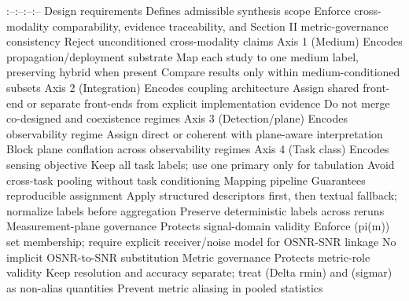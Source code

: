 {}\markdownRendererPipe{}:--\markdownRendererPipe{}:--\markdownRendererPipe{}:--\markdownRendererPipe{}:--\markdownRendererPipe{}\markdownRendererSoftLineBreak
{}\markdownRendererPipe{} Design requirements \markdownRendererPipe{} Defines admissible synthesis scope \markdownRendererPipe{} Enforce cross-modality comparability, evidence traceability, and Section II metric-governance consistency \markdownRendererPipe{} Reject unconditioned cross-modality claims \markdownRendererPipe{}\markdownRendererSoftLineBreak
{}\markdownRendererPipe{} Axis 1 (Medium) \markdownRendererPipe{} Encodes propagation/deployment substrate \markdownRendererPipe{} Map each study to one medium label, preserving hybrid when present \markdownRendererPipe{} Compare results only within medium-conditioned subsets \markdownRendererPipe{}\markdownRendererSoftLineBreak
{}\markdownRendererPipe{} Axis 2 (Integration) \markdownRendererPipe{} Encodes coupling architecture \markdownRendererPipe{} Assign shared front-end or separate front-ends from explicit implementation evidence \markdownRendererPipe{} Do not merge co-designed and coexistence regimes \markdownRendererPipe{}\markdownRendererSoftLineBreak
{}\markdownRendererPipe{} Axis 3 (Detection/plane) \markdownRendererPipe{} Encodes observability regime \markdownRendererPipe{} Assign direct or coherent with plane-aware interpretation \markdownRendererPipe{} Block plane conflation across observability regimes \markdownRendererPipe{}\markdownRendererSoftLineBreak
{}\markdownRendererPipe{} Axis 4 (Task class) \markdownRendererPipe{} Encodes sensing objective \markdownRendererPipe{} Keep all task labels; use one primary only for tabulation \markdownRendererPipe{} Avoid cross-task pooling without task conditioning \markdownRendererPipe{}\markdownRendererSoftLineBreak
{}\markdownRendererPipe{} Mapping pipeline \markdownRendererPipe{} Guarantees reproducible assignment \markdownRendererPipe{} Apply structured descriptors first, then textual fallback; normalize labels before aggregation \markdownRendererPipe{} Preserve deterministic labels across reruns \markdownRendererPipe{}\markdownRendererSoftLineBreak
{}\markdownRendererPipe{} Measurement-plane governance \markdownRendererPipe{} Protects signal-domain validity \markdownRendererPipe{} Enforce (\markdownRendererBackslash{}pi(m)) set membership; require explicit receiver/noise model for OSNR-SNR linkage \markdownRendererPipe{} No implicit OSNR-to-SNR substitution \markdownRendererPipe{}\markdownRendererSoftLineBreak
{}\markdownRendererPipe{} Metric governance \markdownRendererPipe{} Protects metric-role validity \markdownRendererPipe{} Keep resolution and accuracy separate; treat (\markdownRendererBackslash{}Delta r\markdownRendererUnderscore{}\markdownRendererLeftBrace{}\markdownRendererBackslash{}min\markdownRendererRightBrace{}) and (\markdownRendererBackslash{}sigma\markdownRendererUnderscore{}r) as non-alias quantities \markdownRendererPipe{} Prevent metric aliasing in pooled statistics \markdownRendererPipe{}\markdownRendererSoftLineBreak
